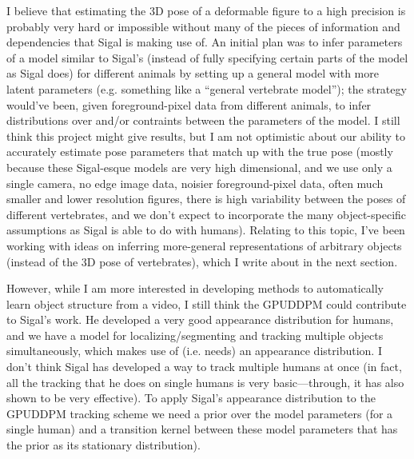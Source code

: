 \documentclass{article}
\begin{document}
I believe that estimating the 3D pose of a deformable figure to a high precision is probably very hard or impossible without many of the pieces of information and dependencies that Sigal is making use of. An initial plan was to infer parameters of a model similar to Sigal's (instead of fully specifying certain parts of the model as Sigal does) for different animals by setting up a general model with more latent parameters (e.g. something like a ``general vertebrate model''); the strategy would've been, given foreground-pixel data from different animals, to infer distributions over and/or contraints between the parameters of the model. I still think this project might give results, but I am not optimistic about our ability to accurately estimate pose parameters that match up with the true pose (mostly because these Sigal-esque models are very high dimensional, and we use only a single camera, no edge image data, noisier foreground-pixel data, often much smaller and lower resolution figures, there is high variability between the poses of different vertebrates, and we don't expect to incorporate the many object-specific assumptions as Sigal is able to do with humans). Relating to this topic, I've been working with ideas on inferring more-general representations of arbitrary objects (instead of the 3D pose of vertebrates), which I write about in the next section.

However, while I am more interested in developing methods to automatically learn object structure from a video, I still think the GPUDDPM could contribute to Sigal's work. He developed a very good appearance distribution for humans, and we have a model for localizing/segmenting and tracking multiple objects simultaneously, which makes use of (i.e. needs) an appearance distribution. I don't think Sigal has developed a way to track multiple humans at once (in fact, all the tracking that he does on single humans is very basic---through, it has also shown to be very effective). To apply Sigal's appearance distribution to the GPUDDPM tracking scheme we need a prior over the model parameters (for a single human) and a transition kernel between these model parameters that has the prior as its stationary distribution).
\end{document}
